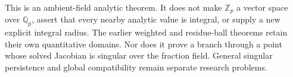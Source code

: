 This is an ambient-field analytic theorem. It does not make $\mathbb Z_p$ a vector space over $\mathbb Q_p$, assert that every nearby analytic value is integral, or supply a new explicit integral radius. The earlier weighted and residue-ball theorems retain their own quantitative domains. Nor does it prove a branch through a point whose solved Jacobian is singular over the fraction field. General singular persistence and global compatibility remain separate research problems.

